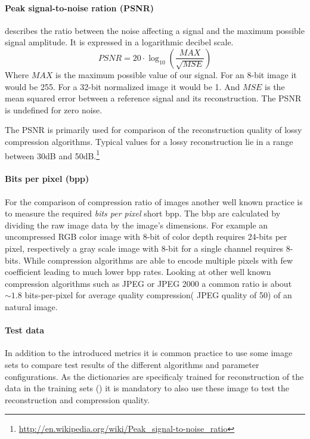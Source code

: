 \paragraph{Peak signal-to-noise ration (PSNR)} describes the ratio between the
noise affecting a signal and the maximum possible signal amplitude. It is
expressed in a logarithmic decibel scale.
\begin{equation*}
 PSNR = 20 \cdot \log_{10} \left(\frac{MAX}{\sqrt{MSE}}\right)
\end{equation*}
Where $MAX$ is the maximum possible value of our signal. For an 8-bit
image it would be 255. For a 32-bit normalized image it would be 1. And $MSE$ is
the mean squared error between a reference signal and its reconstruction. The
PSNR is undefined for zero noise.

The PSNR is primarily used for comparison of the reconstruction quality of
lossy compression algorithms. Typical values for a lossy reconstruction lie in
a range between 30dB and
50dB.\footnote{\url{http://en.wikipedia.org/wiki/Peak_signal-to-noise_ratio}}

\paragraph{Bits per pixel (bpp)} 
For the comparison of compression ratio of images another well known practice is
to measure the required \emph{bits per pixel} short bpp. The bbp are calculated
by dividing the raw image data by the image's dimensions. For example an
uncompressed RGB color image with 8-bit of color depth requires 24-bits per
pixel, respectively a gray scale image with 8-bit for a single channel requires
8-bits. While compression algorithms are able to encode multiple pixels with few
coefficient leading to much lower bpp rates.
Looking at other well known compression algorithms such as JPEG or
JPEG 2000 a common ratio is about $\sim1.8$ bits-per-pixel for average
quality compression( JPEG quality of 50) of an natural image. 


\paragraph{Test data}
In addition to the introduced metrics it is common practice to use some image
sets to compare test results of the different algorithms and parameter
configurations. As the dictionaries are specificaly trained for
reconstruction of the data in the training sets
() it is mandatory to also use
these image to test the reconstruction and
compression quality. 

